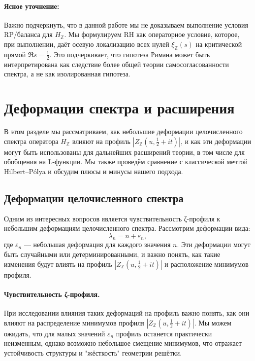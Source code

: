 \documentclass{article}
\numberwithin{equation}{section}
\theoremstyle{plain}
\theoremstyle{definition}
\theoremstyle{remark}
\begin{document}
\paragraph{Ясное уточнение:}
\noindent
Важно подчеркнуть, что в данной работе мы не доказываем выполнение условия RP/баланса для \( H_{\mathbb{Z}} \). Мы формулируем RH как операторное условие, которое, при выполнении, даёт осевую локализацию всех нулей \( \xi_{\mathbb{Z}}(s) \) на критической прямой \( \Re s = \tfrac{1}{2} \). Это подчеркивает, что гипотеза Римана может быть интерпретирована как следствие более общей теории самосогласованности спектра, а не как изолированная гипотеза.
\clearpage


\section{Деформации спектра и расширения}
\label{sec:spectrum-deformations}

\noindent
В этом разделе мы рассматриваем, как небольшие деформации целочисленного спектра оператора \( H_{\mathbb{Z}} \) влияют на профиль \( |Z_{\mathbb{Z}}(u, \frac{1}{2} + it)| \), и как эти деформации могут быть использованы для дальнейших расширений теории, в том числе для обобщения на L-функции. Мы также проведём сравнение с классической мечтой Hilbert–Pólya и обсудим плюсы и минусы нашего подхода.

\subsection{Деформации целочисленного спектра}
\label{subsec:spectrum-deformations}

\noindent
Одним из интересных вопросов является чувствительность ζ-профиля к небольшим деформациям целочисленного спектра. Рассмотрим деформации вида:
\[
\lambda_n = n + \varepsilon_n,
\]
где \( \varepsilon_n \) — небольшая деформация для каждого значения \( n \). Эти деформации могут быть случайными или детерминированными, и важно понять, как такие изменения будут влиять на профиль \( |Z_{\mathbb{Z}}(u, \frac{1}{2} + it)| \) и расположение минимумов профиля.

\paragraph{Чувствительность ζ-профиля.}
\noindent
При исследовании влияния таких деформаций на профиль важно понять, как они влияют на распределение минимумов профиля \( |Z_{\mathbb{Z}}(u, \frac{1}{2} + it)| \). Мы можем ожидать, что для малых значений \( \varepsilon_n \) профиль останется практически неизменным, однако возможно небольшое смещение минимумов, что отражает устойчивость структуры и "жёсткость" геометрии решётки.
\end{document}
